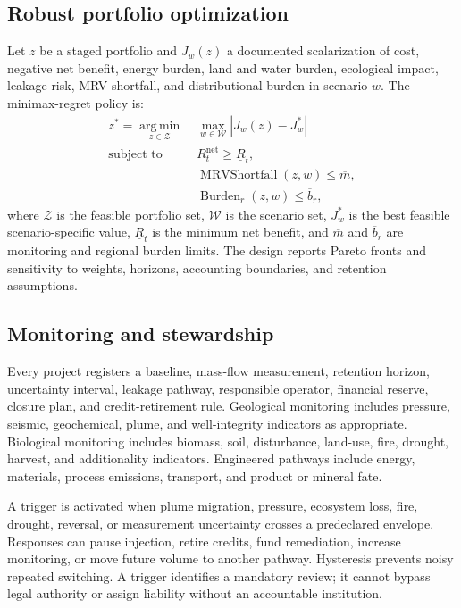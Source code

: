 \documentclass[conference]{IEEEtran}
\begin{document}
\subsection{Robust portfolio optimization}
Let $z$ be a staged portfolio and $J_w(z)$ a documented scalarization of cost, negative net benefit, energy burden, land and water burden, ecological impact, leakage risk, MRV shortfall, and distributional burden in scenario $w$. The minimax-regret policy is:
\begin{equation}
\begin{aligned}
z^*=\mathop{\mathrm{arg\,min}}\limits_{z\in\mathcal{Z}}\;&\max_{w\in\mathcal{W}}\left|J_w(z)-J_w^*\right|\nonumber\\
\text{subject to }&R_t^{\mathrm{net}}\geq \underline{R}_t,\nonumber\\
&\operatorname{MRVShortfall}(z,w)\leq \overline{m},\nonumber\\
&\operatorname{Burden}_{r}(z,w)\leq \overline{b}_r,
\end{aligned}
\label{eq:robust}
\end{equation}
where $\mathcal{Z}$ is the feasible portfolio set, $\mathcal{W}$ is the scenario set, $J_w^*$ is the best feasible scenario-specific value, $\underline{R}_t$ is the minimum net benefit, and $\overline{m}$ and $\overline{b}_r$ are monitoring and regional burden limits. The design reports Pareto fronts and sensitivity to weights, horizons, accounting boundaries, and retention assumptions.

\subsection{Monitoring and stewardship}
Every project registers a baseline, mass-flow measurement, retention horizon, uncertainty interval, leakage pathway, responsible operator, financial reserve, closure plan, and credit-retirement rule. Geological monitoring includes pressure, seismic, geochemical, plume, and well-integrity indicators as appropriate. Biological monitoring includes biomass, soil, disturbance, land-use, fire, drought, harvest, and additionality indicators. Engineered pathways include energy, materials, process emissions, transport, and product or mineral fate.

A trigger is activated when plume migration, pressure, ecosystem loss, fire, drought, reversal, or measurement uncertainty crosses a predeclared envelope. Responses can pause injection, retire credits, fund remediation, increase monitoring, or move future volume to another pathway. Hysteresis prevents noisy repeated switching. A trigger identifies a mandatory review; it cannot bypass legal authority or assign liability without an accountable institution.
\end{document}
